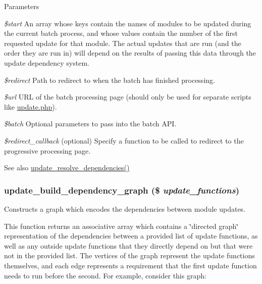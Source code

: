 \begin{DoxyParams}{Parameters}
\item[{\em \$start}]An array whose keys contain the names of modules to be updated during the current batch process, and whose values contain the number of the first requested update for that module. The actual updates that are run (and the order they are run in) will depend on the results of passing this data through the update dependency system. \item[{\em \$redirect}]Path to redirect to when the batch has finished processing. \item[{\em \$url}]URL of the batch processing page (should only be used for separate scripts like \hyperlink{update_8php}{update.php}). \item[{\em \$batch}]Optional parameters to pass into the batch API. \item[{\em \$redirect\_\-callback}](optional) Specify a function to be called to redirect to the progressive processing page.\end{DoxyParams}
\begin{DoxySeeAlso}{See also}
\hyperlink{update_8inc_aa931d6cdddc2e9e0ec96d240523056e9}{update\_\-resolve\_\-dependencies()} 
\end{DoxySeeAlso}
\hypertarget{update_8inc_aafca47c65645d8463d85a3fa7884c220}{
\subsubsection[{update\_\-build\_\-dependency\_\-graph}]{\setlength{\rightskip}{0pt plus 5cm}update\_\-build\_\-dependency\_\-graph (\$ {\em update\_\-functions})}}
\label{update_8inc_aafca47c65645d8463d85a3fa7884c220}
Constructs a graph which encodes the dependencies between module updates.

This function returns an associative array which contains a \char`\"{}directed graph\char`\"{} representation of the dependencies between a provided list of update functions, as well as any outside update functions that they directly depend on but that were not in the provided list. The vertices of the graph represent the update functions themselves, and each edge represents a requirement that the first update function needs to run before the second. For example, consider this graph:

